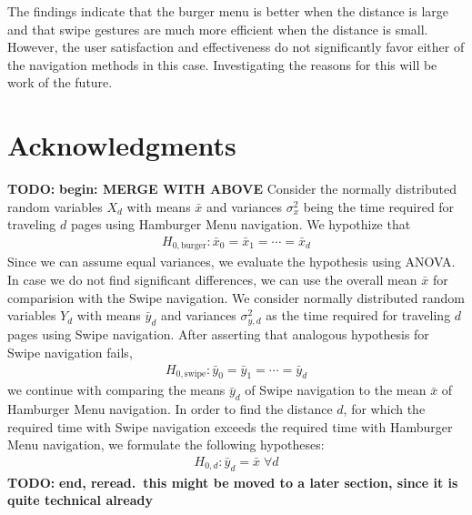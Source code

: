 \documentclass{sig-alternate-05-2015}
\newcommand{\todo}{\textbf{TODO:} \textbf}
\begin{document}
The findings indicate that the burger menu is better when the distance is large and that swipe gestures are much more efficient
when the distance is small. However, the user satisfaction and effectiveness do not significantly favor either of the navigation methods in this case.
Investigating the reasons for this will be work of the future.

\section{Acknowledgments}

%

%
%
\newpage
\onecolumn
\appendix
\todo{begin: MERGE WITH ABOVE}
Consider the normally distributed random variables $X_d$ with means $\bar x$ and
variances $\sigma_x^2$ being the time required for traveling $d$ pages using Hamburger
Menu navigation.
We hypothize that
\begin{align*}
	H_{0, \text{burger}}: \bar x_0 = \bar x_1 = \cdots = \bar x_d
\end{align*}
Since we can assume equal variances,
we evaluate the hypothesis using {ANOVA}.
In case we do not find significant differences, we can use the overall mean
$\bar x$ for comparision with the Swipe navigation. 
We consider normally
distributed random variables $Y_d$ with means $\bar y_d$ and variances $\sigma_{y,d}^2$ as the
time required for traveling $d$ pages using Swipe navigation. 
After asserting
that analogous hypothesis for Swipe navigation fails,
\begin{align*}
	H_{0, \text{swipe}}: \bar y_0 = \bar y_1= \cdots = \bar y_d
\end{align*}
we continue with comparing the means $\bar y_d$ of Swipe navigation to the
mean $\bar x$ of Hamburger Menu navigation.  In order to find the distance
$d$, for which the required time with Swipe navigation exceeds the required
time with Hamburger Menu navigation, we formulate the following hypotheses:
\begin{align*}
	H_{0,d} : \bar y_d = \bar x \;\forall d
\end{align*}
\todo{end, reread.\ this might be moved to a later section, since it is
	quite technical already}
\end{document}
